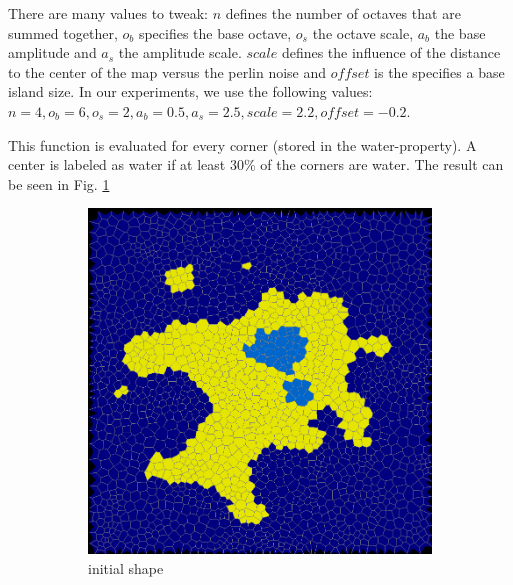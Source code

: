 \documentclass[journal, letterpaper]{IEEEtran}
\begin{document}
There are many values to tweak: $n$ defines the number of octaves that are summed together, $o_b$ specifies the base octave, $o_s$ the octave scale, $a_b$ the base amplitude and $a_s$ the amplitude scale. $scale$ defines the influence of the distance to the center of the map versus the perlin noise and $offset$ is the specifies a base island size.
In our experiments, we use the following values: $n=4, o_b=6, o_s=2, a_b=0.5, a_s=2.5, scale=2.2, offset=-0.2$.

This function is evaluated for every corner (stored in the water-property). A center is labeled as water if at least 30\% of the corners are water.
The result can be seen in Fig. \ref{fig:shape}

\begin{figure}
	\centering
	\begin{subfigure}[b]{0.3\textwidth}
		\includegraphics[width=\textwidth]{images/elevation1}
		\caption{initial shape}
		\label{fig:shape}
	\end{subfigure}
	\begin{subfigure}[b]{0.3\textwidth}

\end{subfigure}
\end{figure}
\end{document}
